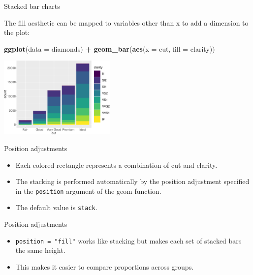 \documentclass[ignorenonframetext,]{beamer}
\newenvironment{Shaded}{\begin{snugshade}}{\end{snugshade}}
\newcommand{\DataTypeTok}[1]{\textcolor[rgb]{0.13,0.29,0.53}{#1}}
\newcommand{\KeywordTok}[1]{\textcolor[rgb]{0.13,0.29,0.53}{\textbf{#1}}}
\newcommand{\NormalTok}[1]{#1}
\newcommand{\OperatorTok}[1]{\textcolor[rgb]{0.81,0.36,0.00}{\textbf{#1}}}
\newcommand{\StringTok}[1]{\textcolor[rgb]{0.31,0.60,0.02}{#1}}
\begin{document}
\begin{frame}[fragile]{Stacked bar charts}
\protect\hypertarget{stacked-bar-charts}{}

The fill aesthetic can be mapped to variables other than x to add a
dimension to the plot:

\begin{Shaded}
\begin{Highlighting}[]
\KeywordTok{ggplot}\NormalTok{(}\DataTypeTok{data =}\NormalTok{ diamonds) }\OperatorTok{+}\StringTok{ }
\StringTok{  }\KeywordTok{geom_bar}\NormalTok{(}\KeywordTok{aes}\NormalTok{(}\DataTypeTok{x =}\NormalTok{ cut, }\DataTypeTok{fill =}\NormalTok{ clarity))}
\end{Highlighting}
\end{Shaded}

\begin{center}\includegraphics[height=150px]{data-visualization_files/figure-beamer/unnamed-chunk-126-1} \end{center}

\end{frame}

\begin{frame}[fragile]{Position adjustments}
\protect\hypertarget{position-adjustments}{}

\begin{itemize}
\item
  Each colored rectangle represents a combination of cut and clarity.
\item
  The stacking is performed automatically by the position adjustment
  specified in the \texttt{position} argument of the geom function.
\item
  The default value is \texttt{stack}.
\end{itemize}

\end{frame}

\begin{frame}[fragile]{Position adjustments}
\protect\hypertarget{position-adjustments-1}{}

\begin{itemize}
\item
  \texttt{position\ =\ "fill"} works like stacking but makes each set of
  stacked bars the same height.
\item
  This makes it easier to compare proportions across groups.
\end{itemize}

\end{frame}
\end{document}
